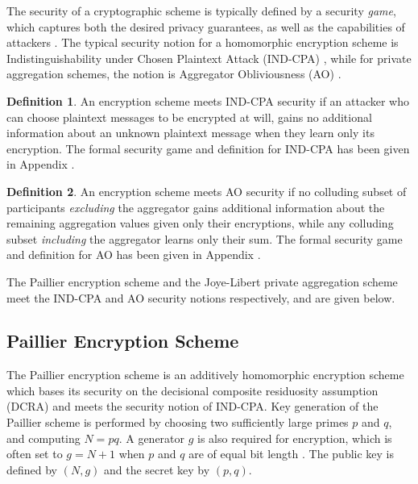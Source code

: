 \documentclass[10pt,letterpaper,oneside,twocolumn,journal]{IEEEtran}
\theoremstyle{definition}
\newtheorem{definition}{Definition}[section]
\theoremstyle{definition}
\theoremstyle{remark}
\begin{document}

The security of a cryptographic scheme is typically defined by a security \textit{game}, which captures both the desired privacy guarantees, as well as the capabilities of attackers \cite{katzIntroductionModernCryptography2008}. The typical security notion for a homomorphic encryption scheme is Indistinguishability under Chosen Plaintext Attack (IND-CPA) \cite{chaseSecurityHomomorphicEncryption2017}, while for private aggregation schemes, the notion is Aggregator Obliviousness (AO) \cite{shiPrivacyPreservingAggregationTimeSeries2011}. 
\begin{definition}
An encryption scheme meets IND-CPA security if an attacker who can choose plaintext messages to be encrypted at will, gains no additional information about an unknown plaintext message when they learn only its encryption. The formal security game and definition for IND-CPA has been given in Appendix .
\end{definition}
\begin{definition}
An encryption scheme meets AO security if no colluding subset of participants \textit{excluding} the aggregator gains additional information about the remaining aggregation values given only their encryptions, while any colluding subset \textit{including} the aggregator learns only their sum. The formal security game and definition for AO has been given in Appendix .
\end{definition}

The Paillier encryption scheme and the Joye-Libert private aggregation scheme meet the IND-CPA and AO security notions respectively, and are given below.

% 
% 

\subsection{Paillier Encryption Scheme} \label{subsec:paillier_scheme}
The Paillier encryption scheme \cite{paillierPublicKeyCryptosystemsBased1999} is an additively homomorphic encryption scheme which bases its security on the decisional composite residuosity assumption (DCRA) and meets the security notion of IND-CPA. Key generation of the Paillier scheme is performed by choosing two sufficiently large primes $p$ and $q$, and computing $N=pq$. A generator $g$ is also required for encryption, which is often set to $g=N+1$ when $p$ and $q$ are of equal bit length \cite{katzIntroductionModernCryptography2008}. The public key is defined by $(N, g)$ and the secret key by $(p, q)$.
\end{document}
